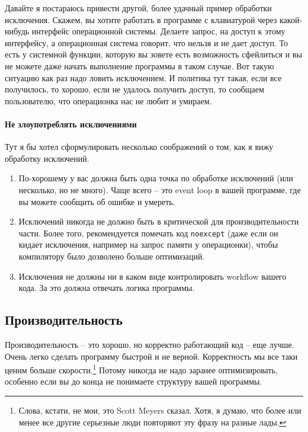 \documentclass{article}
\begin{document}
Давайте я постараюсь привести другой, более удачный пример обработки исключения. Скажем, вы хотите работать в программе с клавиатурой через какой-нибудь интерфейс операционной системы. Делаете запрос, на доступ к этому интерфейсу, а операционная система говорит, что нельзя и не дает доступ. То есть у системной функции, которую вы зовете есть возможность сфейлиться и вы не можете даже начать выполнение программы в таком случае. Вот такую ситуацию как раз надо ловить исключением. И политика тут такая, если все получилось, то хорошо, если не удалось получить доступ, то сообщаем пользователю, что операционка нас не любит и умираем.

\paragraph{Не злоупотреблять исключениями}

Тут я бы хотел сформулировать несколько соображений о том, как я вижу обработку исключений.
\begin{enumerate}
\item По-хорошему у вас должна быть одна точка по обработке исключений (или несколько, но не много). Чаще всего -- это event loop в вашей программе, где вы можете сообщить об ошибке и умереть.

\item Исключений никогда не должно быть в критической для производительности части. Более того, рекомендуется помечать код \verb"noexcept" (даже если он кидает исключения, например на запрос памяти у операционки), чтобы компилятору было дозволено больше оптимизаций.

\item Исключения не должны ни в каком виде контролировать workflow вашего кода. За это должна отвечать логика программы. 
\end{enumerate}

\subsection{Производительность}

Производительность -- это хорошо, но корректно работающий код -- еще лучше. Очень легко сделать программу быстрой и не верной. Корректность мы все таки ценим больше скорости.\footnote{Слова, кстати, не мои, это Scott Meyers сказал. Хотя, я думаю, что более или менее все другие серьезные люди повторяют эту фразу на разные лады.} Потому никогда не надо заранее оптимизировать, особенно если вы до конца не понимаете структуру вашей программы.
\end{document}
